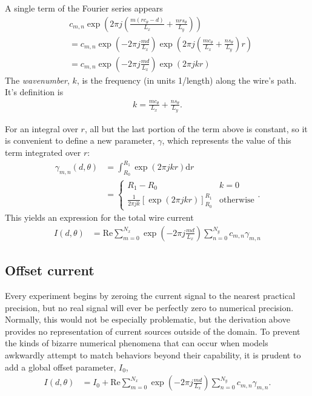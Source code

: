 \documentclass{article}
\def\d{\mathrm{d}}
\def\real{\mathrm{Re}}
\begin{document}
A single term of the Fourier series appears
\begin{align*}
&c_{m,n} \exp\left(2\pi j \left( \frac{m(r c_\theta - d)}{L_x} + \frac{n r s_\theta}{L_y} \right)\right)\\
&= c_{m,n} \exp\left(-2\pi j \frac{md}{L_x} \right) \exp\left(2\pi j \left( \frac{m c_\theta}{L_x} + \frac{n s_\theta}{L_y} \right) r\right)\\
&= c_{m,n} \exp\left(-2\pi j \frac{md}{L_x} \right) \exp\left(2\pi j k r \right)
\end{align*}
The \emph{wavenumber}, $k$, is the frequency (in units 1/length) along the wire's path.  It's definition is
\begin{align}
k = \frac{m c_\theta}{L_x} + \frac{n s_\theta}{L_y}.
\end{align}

For an integral over $r$, all but the last portion of the term above is constant, so it is convenient to define a new parameter, $\gamma$, which represents the value of this term integrated over $r$:
\begin{align}
\gamma_{m,n}(d,\theta) &= \int_{R_0}^{R_1} \exp\left(2\pi j k r \right) \d r \nonumber\\
 &= \left\{\begin{array}{c|l}
 R_1 - R_0 & k = 0\\
 \frac{1}{2\pi j k}\left[\exp\left(2\pi j k r \right)\right]^{R_1}_{R_0} & \mathrm{otherwise}
\end{array}
\right. .
\end{align}
This yields an expression for the total wire current
\begin{align}
I(d,\theta) &= \real \sum_{m=0}^{N_x} \exp\left(-2\pi j \frac{md}{L_x} \right) \sum_{n=0}^{N_y} c_{m,n} \gamma_{m,n} 
\end{align}

\subsection{Offset current}

Every experiment begins by zeroing the current signal to the nearest practical precision, but no real signal will ever be perfectly zero to numerical precision.  Normally, this would not be especially problematic, but the derivation above provides no representation of current sources outside of the domain.  To prevent the kinds of bizarre numerical phenomena that can occur when models awkwardly attempt to match behaviors beyond their capability, it is prudent to add a global offset parameter, $I_0$,  
\begin{align}
I(d,\theta) &= I_0 + \real \sum_{m=0}^{N_x} \exp\left(-2\pi j \frac{md}{L_x} \right) \sum_{n=0}^{N_y} c_{m,n}\gamma_{m,n}\label{eqn:I}.
\end{align}
\end{document}
